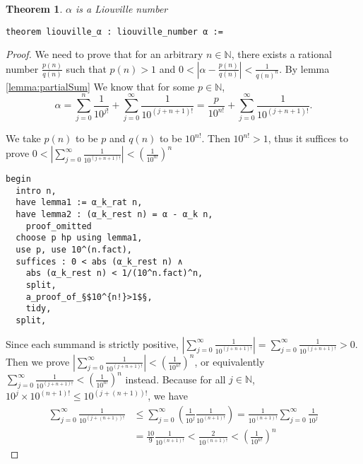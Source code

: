 \documentclass{report}
\theoremstyle{definition}
\theoremstyle{plain}
\newtheorem{theorem}{Theorem}[section]
\begin{document}
\begin{theorem}\label{thm:alphaTrans}
$\alpha$ is a Liouville number
\begin{verbatim}
theorem liouville_α : liouville_number α :=
\end{verbatim}
\end{theorem}
\begin{proof}
We need to prove that for an arbitrary $n\in\mathbb N$, there exists a rational number $\frac{p(n)}{q(n)}$ such that $p(n)>1$ and $0 < \left|\alpha-\frac{p(n)}{q(n)}\right|<\frac{1}{q(n)^n}$. By lemma \ref{lemma:partialSum} We know that for some $p\in\mathbb N$,
$$
\alpha=\sum_{j=0}^n\frac1{10^{j!}}+\sum_{j=0}^\infty\frac1{10^{(j+n+1)!}}=\frac p{10^{n!}}+\sum_{j=0}^\infty\frac1{10^{(j+n+1)!}}.
$$

We take $p(n)$ to be $p$ and $q(n)$ to be $10^{n!}$. Then $10^{n!}>1$, thus it suffices to prove $0<\left|\sum_{j=0}^\infty\frac1{10^{(j+n+1)!}}\right|<\left(\frac1{10^{n!}}\right)^n$

\begin{verbatim}
begin
  intro n,
  have lemma1 := α_k_rat n,
  have lemma2 : (α_k_rest n) = α - α_k n,
    proof_omitted
  choose p hp using lemma1,
  use p, use 10^(n.fact),
  suffices : 0 < abs (α_k_rest n) ∧ 
    abs (α_k_rest n) < 1/(10^n.fact)^n,
    split,
    a_proof_of_§$10^{n!}>1$§,
    tidy,
  split,
\end{verbatim}

Since each summand is strictly positive, $\left|\sum_{j=0}^\infty\frac1{10^{(j+n+1)!}}\right|=\sum_{j=0}^\infty\frac1{10^{(j+n+1)!}} > 0$. Then we prove $\left|\sum_{j=0}^\infty\frac1{10^{(j+n+1)!}}\right|<\left(\frac1{10^{n!}}\right)^n$, or equivalently $\sum_{j=0}^\infty\frac1{10^{(j+n+1)!}}<\left(\frac1{10^{n!}}\right)^n$ instead. Because for all $j\in\mathbb N$, $10^j\times 10^{(n+1)!}\le 10^{(j+(n+1))!}$, we have
\begin{equation*}
\begin{aligned}
\sum_{j=0}^\infty\frac1{10^{(j+(n+1))!}}&\le\sum_{j=0}^\infty\left(\frac1{10^j}\frac1{10^{(n+1)!}}\right)=\frac{1}{10^{(n+1)!}}\sum_{j=0}^\infty\frac1{10^j}\\
&=\frac{10} 9\frac{1}{10^{(n+1)!}} < \frac2{10^{(n+1)!}}<\left(\frac1{10^{n!}}\right)^n
\end{aligned}
\end{equation*}


\end{proof}
\end{document}
